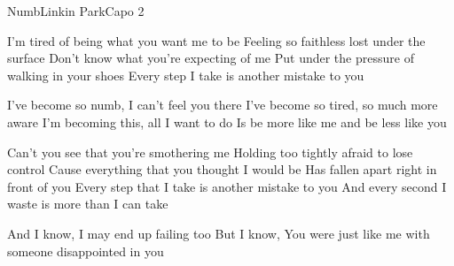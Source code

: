 \begin{song}{Numb}{Linkin Park}{Capo 2}

I'm tired of being what you want me to be
Feeling so faithless lost under the surface
  Don't know what you're expecting of me
Put under the pressure of walking in your shoes
Every step I take is another mistake to you

I've become so numb, I can't feel you there
I've become so tired, so much more aware
I'm becoming this, all I want to do
Is be more like me and be less like you

Can't you see that you're smothering me
Holding too tightly afraid to lose control
Cause everything that you thought I would be
Has fallen apart right in front of you
Every step that I take is another mistake to you
And every second I waste is more than I can take


And I know, I may end up   failing too
But I know, You were just like me with someone disappointed in you


\end{song}
